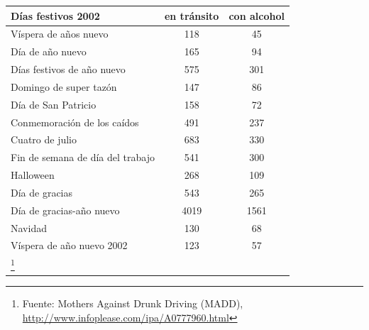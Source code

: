 \documentclass[10pt,twoside]{article}
\begin{document}
\begin{enumerate}
\begin{center}
\begin{tabular}{lcc}
\hspace{15pt} Días festivos 2002 & en tránsito & con alcohol \\ 
\hline 
Víspera de años nuevo & 118 & 45 \\ 
Día de año nuevo & 165 & 94 \\ 
Días festivos de año nuevo & 575 & 301 \\ 
Domingo de super tazón & 147 & 86 \\ 
Día de San Patricio & 158 & 72 \\ 
Conmemoración de los caídos & 491 & 237 \\ 
Cuatro de julio & 683 & 330 \\ 
Fin de semana de día del trabajo & 541 & 300 \\ 
Halloween & 268 & 109 \\ 
Día de gracias & 543 & 265 \\ 
Día de gracias-año nuevo & 4019 & 1561 \\ 
Navidad & 130 & 68 \\ 
Víspera de año nuevo 2002 & 123 & 57 \\ 
\hline \footnote{Fuente: Mothers Against Drunk Driving (MADD), \url{http://www.infoplease.com/ipa/A0777960.html}}
\end{tabular}
\end{center}
\end{enumerate}
\end{document}
